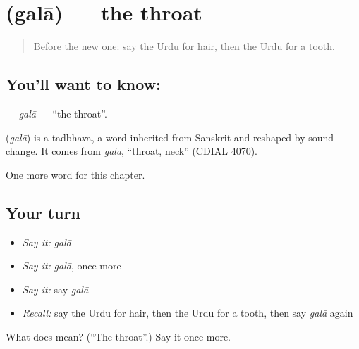 \section[\texorpdfstring{\ur{گلا} (galā)}{گلا (galā)}]{ (galā) — the throat}

\label{lesson:UR-C38-gala}



\begin{quote}
Before the new one: say the Urdu for hair, then the Urdu for a tooth.
\end{quote}

\subsection*{You'll want to know: }
\textbf{} — \emph{galā} — \textquotedblleft{}the throat\textquotedblright{}.

\begin{cousinweb}
\textbf{} (\emph{galā}) is a tadbhava, a word inherited from Sanskrit and reshaped by sound change. It comes from \emph{gala}, \textquotedblleft{}throat, neck\textquotedblright{} (CDIAL 4070).
\end{cousinweb}

\begin{grammarlens}[title={What you've built}]
One more word for this chapter.
\end{grammarlens}

\subsection*{Your turn}
\begin{itemize}
\raggedright
  \item \emph{Say it:} \emph{galā}
  \item \emph{Say it:} \emph{galā}, once more
  \item \emph{Say it:} say \emph{galā}
  \item \emph{Recall:} say the Urdu for hair, then the Urdu for a tooth, then say \emph{galā} again
\end{itemize}

\begin{tcolorbox}[breakable,colback=teal!4,colframe=teal!35!black,title={Before you move on}]
What does  mean? (\textquotedblleft{}The throat\textquotedblright{}.) Say it once more.
\end{tcolorbox}
